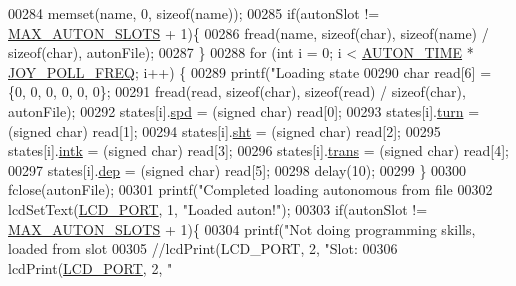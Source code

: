 \begin{DoxyCode}
{{{{{{{{{{{{{{{{{{{{{{{{{{{{{{{{{{00284     memset(name, 0, \textcolor{keyword}{sizeof}(name));
00285     \textcolor{keywordflow}{if}(autonSlot != \hyperlink{autonrecorder_8h_a5173a11a545cb4020fdd139552dc15c1}{MAX\_AUTON\_SLOTS} + 1)\{
00286         fread(name, \textcolor{keyword}{sizeof}(\textcolor{keywordtype}{char}), \textcolor{keyword}{sizeof}(name) / \textcolor{keyword}{sizeof}(\textcolor{keywordtype}{char}), autonFile);
00287     \}
00288     \textcolor{keywordflow}{for} (\textcolor{keywordtype}{int} i = 0; i < \hyperlink{autonrecorder_8h_aa19f7c427989a0a67f55958c610d0355}{AUTON\_TIME} * \hyperlink{autonrecorder_8h_a3d2260a30e7ce727bef0402edee4b205}{JOY\_POLL\_FREQ}; i++) \{
00289         printf(\textcolor{stringliteral}{"Loading state %
00290         \textcolor{keywordtype}{char} read[6] = \{0, 0, 0, 0, 0, 0\};
00291         fread(read, \textcolor{keyword}{sizeof}(\textcolor{keywordtype}{char}), \textcolor{keyword}{sizeof}(read) / \textcolor{keyword}{sizeof}(\textcolor{keywordtype}{char}), autonFile);
00292         states[i].\hyperlink{structjoy_state_a7867156ddb5bc22d57010c5af00c98af}{spd} = (\textcolor{keywordtype}{signed} char) read[0];
00293         states[i].\hyperlink{structjoy_state_aacdbb758b97190220423402f63020483}{turn} = (\textcolor{keywordtype}{signed} char) read[1];
00294         states[i].\hyperlink{structjoy_state_a751363be4e40b27bcbe558f41a15fe91}{sht} = (\textcolor{keywordtype}{signed} char) read[2];
00295         states[i].\hyperlink{structjoy_state_a2314ed43be31ccc565381efd8398b921}{intk} = (\textcolor{keywordtype}{signed} char) read[3];
00296         states[i].\hyperlink{structjoy_state_acc4f7bae078e8c8b7840cda61382c7cf}{trans} = (\textcolor{keywordtype}{signed} char) read[4];
00297         states[i].\hyperlink{structjoy_state_a3ba5ee3c4eec0e2ee03338b397a17958}{dep} = (\textcolor{keywordtype}{signed} char) read[5];
00298         delay(10);
00299     \}
00300     fclose(autonFile);
00301     printf(\textcolor{stringliteral}{"Completed loading autonomous from file %
00302     lcdSetText(\hyperlink{lcdmsg_8h_abcf42bd88b3c36193f301ca25b033875}{LCD\_PORT}, 1, \textcolor{stringliteral}{"Loaded auton!"});
00303     \textcolor{keywordflow}{if}(autonSlot != \hyperlink{autonrecorder_8h_a5173a11a545cb4020fdd139552dc15c1}{MAX\_AUTON\_SLOTS} + 1)\{
00304         printf(\textcolor{stringliteral}{"Not doing programming skills, loaded from slot %
00305         \textcolor{comment}{//lcdPrint(LCD\_PORT,   2, "Slot: %
00306         lcdPrint(\hyperlink{lcdmsg_8h_abcf42bd88b3c36193f301ca25b033875}{LCD\_PORT}, 2, \textcolor{stringliteral}{"%
}}}}}}}}}}}}}}}}}}}}}}}}}}}}}}}}}}}}}}}
\end{DoxyCode}
